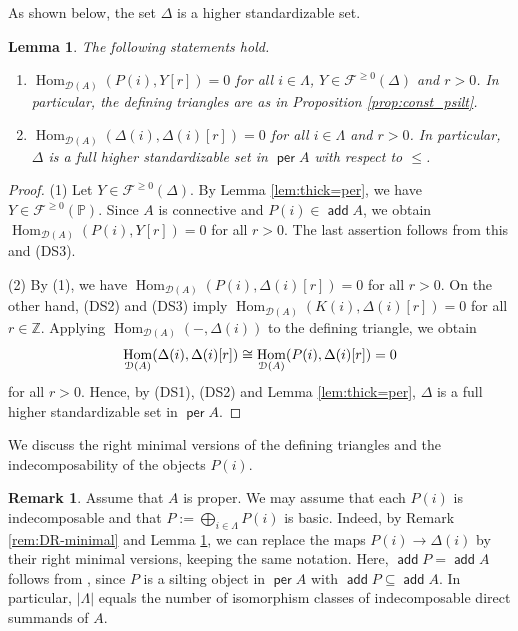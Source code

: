 \documentclass[a4paper,reqno,11pt]{amsart}
\numberwithin{equation}{section}
\newtheorem{lemma}[theorem]{Lemma}
\theoremstyle{definition}
\newtheorem{remark}[theorem]{Remark}
\newcommand{\D}{\mathcal{D}}
\newcommand{\F}{\mathcal{F}}
\newcommand{\ZZ}{\mathbb{Z}}
\newcommand{\PP}{\mathbb{P}}
\newcommand{\bde}{\Delta}
\DeclareMathOperator{\add}{\mathsf{add}}
\DeclareMathOperator{\per}{\mathsf{per}}
\DeclareMathOperator{\Hom}{Hom}
\begin{document}
As shown below, the set $\bde$ is a higher standardizable set.

\begin{lemma}\label{lem:semiorth}
The following statements hold.
\begin{enumerate}
\item $\Hom_{\D(A)}(P(i),Y[r])=0$ for all $i\in\Lambda$, $Y\in\F^{\geq 0}(\bde)$ and $r>0$. In particular, the defining triangles are as in Proposition \ref{prop:const_psilt}.
\item $\Hom_{\D(A)}(\bde(i),\bde(i)[r])=0$ for all $i\in\Lambda$ and $r>0$. In particular, $\bde$ is a full higher standardizable set in $\per A$ with respect to $\leq$.
\end{enumerate}
\end{lemma}
\begin{proof}
(1) Let $Y\in\F^{\geq 0}(\bde)$.
By Lemma \ref{lem:thick=per}, we have $Y\in\F^{\geq 0}(\PP)$.
Since $A$ is connective and $P(i)\in\add A$, we obtain $\Hom_{\D(A)}(P(i),Y[r])=0$ for all $r>0$.
The last assertion follows from this and (DS3).

(2) By (1), we have $\Hom_{\D(A)}(P(i),\bde(i)[r])=0$ for all $r>0$.
On the other hand, (DS2) and (DS3) imply $\Hom_{\D(A)}(K(i),\bde(i)[r])=0$ for all $r\in\ZZ$.
Applying $\Hom_{\D(A)}(-,\bde(i))$ to the defining triangle, we obtain
\begin{align}
\Hom_{\D(A)}(\bde(i),\bde(i)[r]) \cong\Hom_{\D(A)}(P(i),\bde(i)[r])=0\notag
\end{align}
for all $r>0$.
Hence, by (DS1), (DS2) and Lemma \ref{lem:thick=per}, $\bde$ is a full higher standardizable set in $\per A$.
\end{proof}

We discuss the right minimal versions of the defining triangles and the indecomposability of the objects $P(i)$.

\begin{remark}\label{rem:dss_indec}
Assume that $A$ is proper.
We may assume that each $P(i)$ is indecomposable and that $P:=\bigoplus_{i\in\Lambda}P(i)$ is basic.
Indeed, by Remark \ref{rem:DR-minimal} and Lemma \ref{lem:semiorth}, we can replace the maps $P(i)\to\bde(i)$ by their right minimal versions, keeping the same notation.
Here, $\add P=\add A$ follows from \cite[Corollary 2.28]{AI12}, since $P$ is a silting object in $\per A$ with $\add P\subseteq\add A$.
In particular, $|\Lambda|$ equals the number of isomorphism classes of indecomposable direct summands of $A$.
\end{remark}
\end{document}
